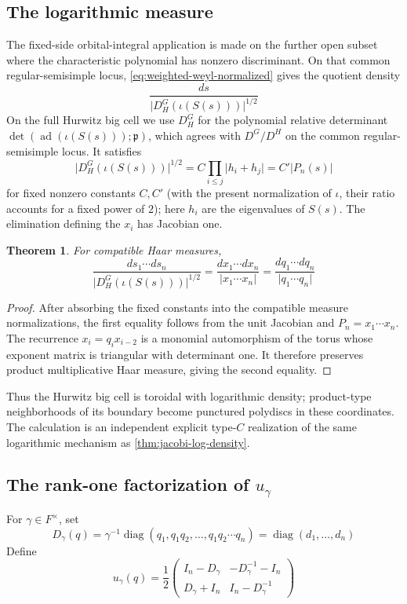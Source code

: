 \documentclass[11pt]{amsart}
\newtheorem{theorem}{Theorem}[section]
\theoremstyle{definition}
\theoremstyle{remark}
\newcommand{\ad}{\operatorname{ad}}
\newcommand{\diag}{\operatorname{diag}}
\newcommand{\abs}[1]{\lvert #1\rvert}
\newcommand{\p}{\mathfrak p}
\begin{document}
\subsection{The logarithmic measure}
The fixed-side orbital-integral application is made on the further open subset
where the characteristic polynomial has nonzero discriminant.  On that common
regular-semisimple locus, \eqref{eq:weighted-weyl-normalized} gives the quotient
density
\[
 \frac{ds}{\abs{D_H^G(\iota(S(s)))}^{1/2}}
\]
On the full Hurwitz big cell we use $D_H^G$ for the polynomial relative
determinant $\det(\ad(\iota(S(s)));\p)$, which agrees with $D^G/D^H$ on the
common regular-semisimple locus.  It satisfies
\[
 \abs{D_H^G(\iota(S(s)))}^{1/2}
 =C\prod_{i\leq j}\abs{h_i+h_j}
 =C'\abs{P_n(s)}
\]
for fixed nonzero constants $C,C'$ (with the present normalization of
$\iota$, their ratio accounts for a fixed power of $2$); here $h_i$ are the
eigenvalues of $S(s)$.  The elimination defining the
$x_i$ has Jacobian one.

\begin{theorem}\label{thm:typeCI-measure}
For compatible Haar measures,
\begin{equation}\label{eq:typeCI-measure}
 \frac{ds_1\cdots ds_n}
 {\abs{D_H^G(\iota(S(s)))}^{1/2}}
 =\frac{dx_1\cdots dx_n}{\abs{x_1\cdots x_n}}
 =\frac{dq_1\cdots dq_n}{\abs{q_1\cdots q_n}}
\end{equation}
\end{theorem}

\begin{proof}
After absorbing the fixed constants into the compatible measure
normalizations, the first equality follows from the unit Jacobian and
$P_n=x_1\cdots x_n$.  The recurrence $x_i=q_ix_{i-2}$ is a monomial automorphism of the torus whose
exponent matrix is triangular with determinant one.  It therefore preserves
product multiplicative Haar measure, giving the second equality.
\end{proof}

Thus the Hurwitz big cell is toroidal with logarithmic density; product-type
neighborhoods of its boundary become punctured polydiscs in these coordinates.
The calculation is an independent explicit type-$C$ realization of the same
logarithmic mechanism as \cref{thm:jacobi-log-density}.

\subsection{\texorpdfstring{The rank-one factorization of $u_\gamma$}{The rank-one factorization of u-gamma}}
For $\gamma\in F^\times$, set
\begin{equation}\label{eq:typeCI-D}
 D_\gamma(q)=\gamma^{-1}\diag
 \left(q_1,q_1q_2,\ldots,q_1q_2\cdots q_n\right)
 =\diag(d_1,\ldots,d_n)
\end{equation}
Define
\begin{equation}\label{eq:typeCI-u}
 u_\gamma(q)=\frac12
 \begin{pmatrix}
 I_n-D_\gamma&-D_\gamma^{-1}-I_n\\
 D_\gamma+I_n&I_n-D_\gamma^{-1}
 \end{pmatrix}
\end{equation}
\end{document}
